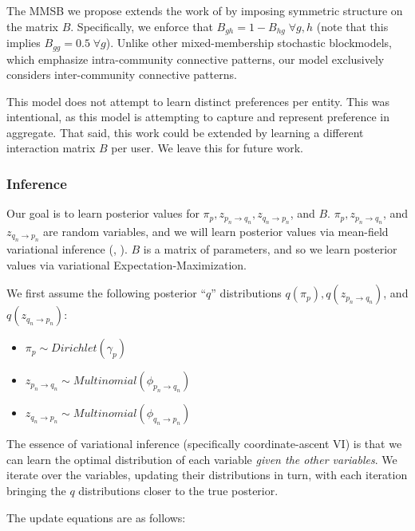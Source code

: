 The MMSB we propose extends the work of \cite{airoldi:2008} by imposing symmetric structure on the matrix $B$.
Specifically, we enforce that $B_{gh} = 1-B_{hg} \; \forall g,h$ (note that this implies $B_{gg}= 0.5 \; \forall g$).
Unlike other mixed-membership stochastic blockmodels, which emphasize intra-community connective patterns, our model exclusively considers inter-community connective patterns.

This model does not attempt to learn distinct preferences per entity.
This was intentional, as this model is attempting to capture and represent preference in aggregate.
That said, this work could be extended by learning a different interaction matrix $B$
per user.
We leave this for future work.

\subsubsection{Inference}

Our goal is to learn posterior values for $\pi_p, z_{p_n \rightarrow q_n}, z_{q_n \rightarrow p_n}$, and $B$.
$\pi_p, z_{p_n \rightarrow q_n}$, and $z_{q_n \rightarrow p_n}$ are random variables, and we will learn posterior values via mean-field variational inference (\cite{wainwright}, \cite{blei:2016}).
$B$ is a matrix of parameters, and so we learn posterior values via variational Expectation-Maximization.

\bigskip

We first assume the following posterior ``$q$'' distributions $q(\pi_p), q(z_{p_n \rightarrow q_n})$, and $q(z_{q_n \rightarrow p_n})$:

\begin{itemize}
	\item $\pi_p \sim Dirichlet(\gamma_p)$
	\item $z_{p_n \rightarrow q_n} \sim Multinomial(\phi_{p_n \rightarrow q_n})$
	\item $z_{q_n \rightarrow p_n} \sim Multinomial(\phi_{q_n \rightarrow p_n})$
\end{itemize}

The essence of variational inference (specifically coordinate-ascent VI) is that we can learn the optimal distribution of each variable \textit{given the other variables}.
We iterate over the variables, updating their distributions in turn, with each iteration bringing the $q$ distributions closer to the true posterior.

The update equations are as follows:

